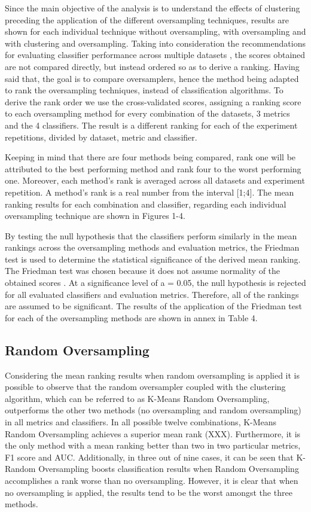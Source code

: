 \documentclass[parskip=full]{scrartcl}
\begin{document}
Since the main objective of the analysis is to understand the effects of 
clustering preceding the application of the different oversampling techniques, 
results are shown for each individual technique without oversampling, with 
oversampling and with clustering and oversampling. Taking into consideration 
the recommendations for evaluating classifier performance across multiple 
datasets \cite{Demsar2006}, the scores obtained are not compared directly, but 
instead ordered so as to derive a ranking. Having said that, the goal is to 
compare oversamplers, hence the method being adapted to rank the oversampling 
techniques, instead of classification algorithms. To derive the rank order we 
use the cross-validated scores, assigning a ranking score to each oversampling 
method for every combination of the datasets, 3 metrics and the 4 classifiers. 
The result is a different ranking for each of the experiment repetitions, 
divided by dataset, metric and classifier. 

Keeping in mind that there are four methods being compared, rank one will be 
attributed to the best performing method and rank four to the worst performing 
one. Moreover, each method's rank is averaged across all datasets and 
experiment repetition. A method's rank is a real number from the interval 
[1;4]. The mean ranking results for each combination and classifier, regarding 
each individual oversampling technique are shown in Figures 1-4.

By testing the null hypothesis that the classifiers perform similarly in the 
mean rankings across the oversampling methods and evaluation metrics, the 
Friedman test \cite{Friedman1937} is used to determine the statistical 
significance of the derived mean ranking. The Friedman test was chosen because 
it does not assume normality of the obtained scores \cite{Demsar2006}. At a 
significance level of a = 0.05, the null hypothesis is rejected for all 
evaluated classifiers and evaluation metrics. Therefore, all of the rankings 
are assumed to be significant. The results of the application of the Friedman 
test for each of the oversampling methods are shown in annex in Table 4.

\subsection{Random Oversampling}

Considering the mean ranking results when random oversampling is applied it is 
possible to observe that the random oversampler coupled with the clustering 
algorithm, which can be referred to as K-Means Random Oversampling, outperforms 
the other two methods (no oversampling and random oversampling) in all metrics 
and classifiers. In all possible twelve combinations, K-Means Random 
Oversampling achieves a superior mean rank (XXX). Furthermore, it is the only 
method with a mean ranking better than two in two particular metrics, F1 score 
and AUC. Additionally, in three out of nine cases, it can be seen that K-Random 
Oversampling boosts classification results when Random Oversampling 
accomplishes a rank worse than no oversampling. However, it is clear that when 
no oversampling is applied, the results tend to be the worst amongst the three 
methods.
\end{document}
